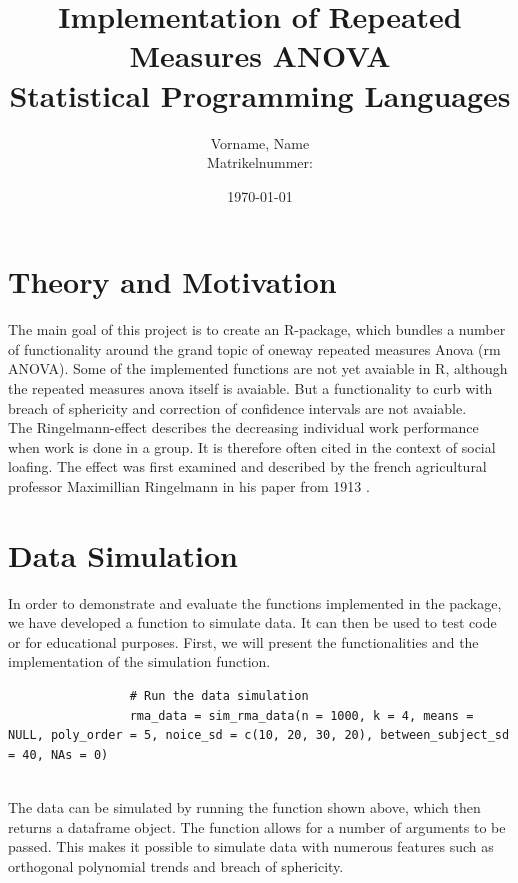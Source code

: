 \documentclass[11pt]{article}
\author{Vorname, Name\\Matrikelnummer: }
\title{\textbf{Implementation of Repeated Measures ANOVA}\\ Statistical Programming Languages \\[5cm]}
\date{\today}
\begin{document}
	\maketitle
	\thispagestyle{fancy}
	\newpage
	\tableofcontents
	\newpage
	\section{Theory and Motivation}
		The main goal of this project is to create an R-package, which bundles a number of functionality around the grand topic of oneway repeated measures Anova (rm ANOVA). Some of the implemented functions are not yet avaiable in R, although the repeated measures anova itself is avaiable. But a functionality to curb with breach of sphericity and correction of confidence intervals are not avaiable.\\
		
		The Ringelmann-effect describes the decreasing individual work performance when work is done in a group. It is therefore often cited in the context of social loafing. The effect was first examined and described by the french agricultural professor Maximillian Ringelmann in his paper from 1913 \citep{ringelmann1913research}. 
	
	\section{Data Simulation}
				 In order to demonstrate and evaluate the functions implemented in the package, we have developed a function to simulate data. It can then be used to test code or for educational purposes. First, we will present the functionalities and the implementation of the simulation function.\\
				 
				 \begin{lstlisting}
				 # Run the data simulation
				 rma_data = sim_rma_data(n = 1000, k = 4, means = NULL, poly_order = 5, noice_sd = c(10, 20, 30, 20), between_subject_sd = 40, NAs = 0)
				 
				 \end{lstlisting}
				 
				 The data can be simulated by running the function shown above, which then returns a dataframe object. The function allows for a number of arguments to be passed. This makes it possible to simulate data with numerous features such as orthogonal polynomial trends and breach of sphericity.\\
				 
\end{document}
